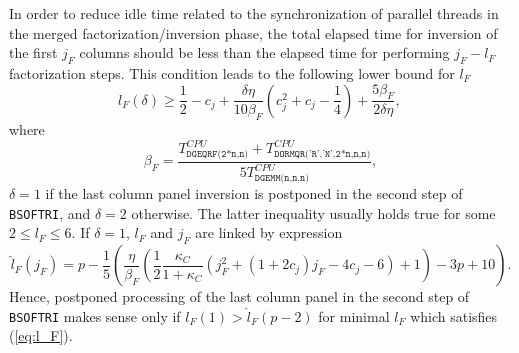 \documentclass{llncs}
\newcommand{\Bsoftri}{\texttt{BSOFTRI}\xspace}
\begin{document}
In order to reduce idle time 
related to %
the synchronization of parallel threads 
in the merged factorization/inversion phase, 
the total elapsed time for inversion of the first $j_F$ columns %
should be less than 
the elapsed time for performing $j_F-l_F$ factorization steps.
This condition leads to the following lower bound for $l_F$
\begin{equation}
  \label{eq:l_F}
  l_{F}(\delta) \ge
  \frac{1}{2} - c_{j} + \frac{\delta \eta}{10 \beta_F } 
  \left( c_{j}^{2} + c_{j}  - \frac{1}{4} \right) + \frac{5 \beta_F }{2 \delta \eta}
  , \,
\end{equation}
where 
\begin{equation*}
  \beta_F  = \frac{T^{CPU}_{\texttt{DGEQRF(2*n,n)}} + T^{CPU}_{\texttt{DORMQR('R','N',2*n,n,n)}}}{5 T^{CPU}_{\texttt{DGEMM(n,n,n)}}},
\end{equation*}
$\delta=1$ if the last column panel inversion 
is postponed in the second step of \Bsoftri,
and $\delta=2$ otherwise. 
The latter inequality usually holds true for some $2 \le l_F \le 6$.
If $\delta=1$, $l_F$ and $j_F$ are linked by expression
\begin{equation*}
  \label{eq:l_F2}
  \hat{l}_F(j_F) = p - {\frac{1}{5}\left(\frac{\eta}{\beta_{F} } 
      \left( \frac{1}{2}\frac{\kappa_{C}}{1+\kappa_{C}} 
        \left(j_F^2 + (1+2c_j)j_F  - 4 c_j - 6 \right) %
        + 1 \right) - 3 p +  10\right) }
  .
\end{equation*}
Hence, postponed processing of the last column panel in the second step of \Bsoftri 
makes sense only if $l_F(1) > \hat{l}_F(p-2)$
for minimal $l_F$ which satisfies (\ref{eq:l_F}).
\end{document}
